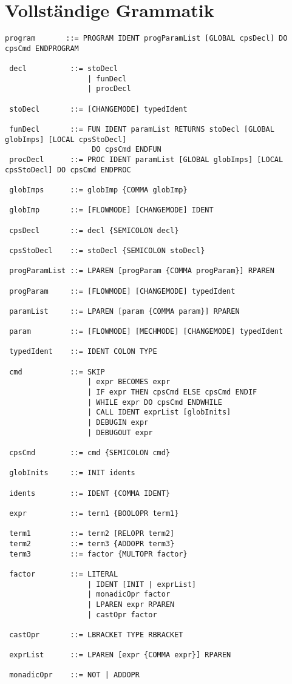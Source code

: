\documentclass[10pt, a4paper, twocolumn]{article} %
\begin{document}
\section{Vollständige Grammatik}
\begin{lstlisting}[backgroundcolor = \color{lightgray},
xleftmargin = 0.05cm,
framexleftmargin = 0.05em]
 program       ::= PROGRAM IDENT progParamList [GLOBAL cpsDecl] DO cpsCmd ENDPROGRAM

 decl          ::= stoDecl
                   | funDecl
                   | procDecl

 stoDecl       ::= [CHANGEMODE] typedIdent

 funDecl       ::= FUN IDENT paramList RETURNS stoDecl [GLOBAL globImps] [LOCAL cpsStoDecl]
                    DO cpsCmd ENDFUN
 procDecl      ::= PROC IDENT paramList [GLOBAL globImps] [LOCAL cpsStoDecl] DO cpsCmd ENDPROC

 globImps      ::= globImp {COMMA globImp}

 globImp       ::= [FLOWMODE] [CHANGEMODE] IDENT

 cpsDecl       ::= decl {SEMICOLON decl}

 cpsStoDecl    ::= stoDecl {SEMICOLON stoDecl}

 progParamList ::= LPAREN [progParam {COMMA progParam}] RPAREN

 progParam     ::= [FLOWMODE] [CHANGEMODE] typedIdent

 paramList     ::= LPAREN [param {COMMA param}] RPAREN

 param         ::= [FLOWMODE] [MECHMODE] [CHANGEMODE] typedIdent

 typedIdent    ::= IDENT COLON TYPE

 cmd           ::= SKIP
                   | expr BECOMES expr
                   | IF expr THEN cpsCmd ELSE cpsCmd ENDIF
                   | WHILE expr DO cpsCmd ENDWHILE
                   | CALL IDENT exprList [globInits]
                   | DEBUGIN expr
                   | DEBUGOUT expr

 cpsCmd        ::= cmd {SEMICOLON cmd}

 globInits     ::= INIT idents

 idents        ::= IDENT {COMMA IDENT}

 expr          ::= term1 {BOOLOPR term1}

 term1         ::= term2 [RELOPR term2]
 term2         ::= term3 {ADDOPR term3}
 term3         ::= factor {MULTOPR factor}

 factor        ::= LITERAL
                   | IDENT [INIT | exprList]
                   | monadicOpr factor
                   | LPAREN expr RPAREN
                   | castOpr factor

 castOpr       ::= LBRACKET TYPE RBRACKET

 exprList      ::= LPAREN [expr {COMMA expr}] RPAREN

 monadicOpr    ::= NOT | ADDOPR
\end{lstlisting}
\end{document}
